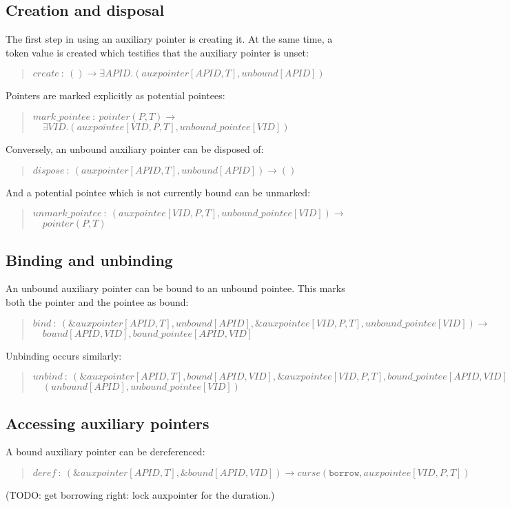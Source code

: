 \documentclass[a4paper]{book}
\newcommand\FuncSignature[2]{\begin{quote}$\mathit{#1}\ :\ \mathit{#2}$\end{quote}}
\newcommand\FuncSignatureII[3]{\begin{quote}$\mathit{#1}\ :\ \mathit{#2} \to$\\${}\quad \mathit{#3}$ \end{quote}}
\begin{document}
\subsection*{Creation and disposal}
The first step in using an auxiliary pointer is creating it.
At the same time, a token value is created which testifies that the
auxiliary pointer is unset:
\FuncSignature{create}{() \to \exists APID.(auxpointer[APID,T], unbound[APID])}

\noindent
Pointers are marked explicitly as potential pointees:
\FuncSignatureII{mark\_pointee}
{pointer(P,T)}
{\exists VID.(auxpointee[VID,P,T], unbound\_pointee[VID])
}

\noindent
Conversely, an unbound auxiliary pointer can be disposed of:
\FuncSignature{dispose}{(auxpointer[APID,T], unbound[APID]) \to ()}

\noindent
And a potential pointee which is not currently bound can be unmarked:
\FuncSignatureII{unmark\_pointee}
{(auxpointee[VID,P,T], unbound\_pointee[VID])
}
{pointer(P,T)}

\subsection*{Binding and unbinding}
An unbound auxiliary pointer can be bound to an unbound pointee.
This marks both the pointer and the pointee as bound:

\FuncSignatureII{bind}
{(\&auxpointer[APID,T], unbound[APID], \&auxpointee[VID,P,T], unbound\_pointee[VID])}
{bound[APID,VID], bound\_pointee[APID,VID]}

\noindent
Unbinding occurs similarly:
\FuncSignatureII{unbind}
{(\&auxpointer[APID,T], bound[APID,VID], \&auxpointee[VID,P,T], bound\_pointee[APID,VID])}
{(unbound[APID], unbound\_pointee[VID])}

\subsection*{Accessing auxiliary pointers}

A bound auxiliary pointer can be dereferenced:

\FuncSignature{deref}{
  (\&auxpointer[APID,T], \&bound[APID,VID])
  \to
  curse(\mathtt{borrow}, auxpointee[VID,P,T])}

(TODO: get borrowing right: lock auxpointer for the duration.)


\end{document}
